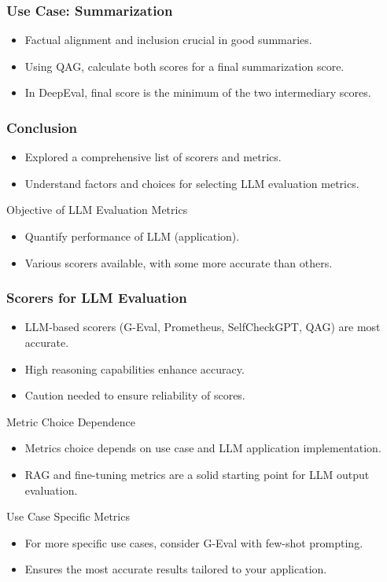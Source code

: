 \begin{frame}[fragile]\frametitle{Use Case: Summarization}
  \begin{itemize}
    \item Factual alignment and inclusion crucial in good summaries.
    \item Using QAG, calculate both scores for a final summarization score.
    \item In DeepEval, final score is the minimum of the two intermediary scores.
  \end{itemize}
\end{frame}

\begin{frame}[fragile]\frametitle{Conclusion}
  \begin{itemize}
    \item Explored a comprehensive list of scorers and metrics.
    \item Understand factors and choices for selecting LLM evaluation metrics.
  \end{itemize}
Objective of LLM Evaluation Metrics
  \begin{itemize}
    \item Quantify performance of LLM (application).
    \item Various scorers available, with some more accurate than others.
  \end{itemize}
\end{frame}

\begin{frame}[fragile]\frametitle{Scorers for LLM Evaluation}
  \begin{itemize}
    \item LLM-based scorers (G-Eval, Prometheus, SelfCheckGPT, QAG) are most accurate.
    \item High reasoning capabilities enhance accuracy.
    \item Caution needed to ensure reliability of scores.
  \end{itemize}
Metric Choice Dependence
  \begin{itemize}
    \item Metrics choice depends on use case and LLM application implementation.
    \item RAG and fine-tuning metrics are a solid starting point for LLM output evaluation.
  \end{itemize}
Use Case Specific Metrics
  \begin{itemize}
    \item For more specific use cases, consider G-Eval with few-shot prompting.
    \item Ensures the most accurate results tailored to your application.
  \end{itemize}
\end{frame}
